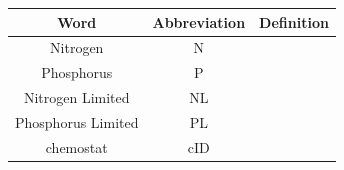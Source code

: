 \documentclass[]{article}
\begin{document}
\begin{longtable}[]{@{}ccc@{}}
\toprule
\begin{minipage}[b]{0.24\columnwidth}\centering\strut
Word\strut
\end{minipage} & \begin{minipage}[b]{0.19\columnwidth}\centering\strut
Abbreviation\strut
\end{minipage} & \begin{minipage}[b]{0.15\columnwidth}\centering\strut
Definition\strut
\end{minipage}\tabularnewline
\midrule
\endhead
\begin{minipage}[t]{0.24\columnwidth}\centering\strut
Nitrogen\strut
\end{minipage} & \begin{minipage}[t]{0.19\columnwidth}\centering\strut
N\strut
\end{minipage} & \begin{minipage}[t]{0.15\columnwidth}\centering\strut
\strut
\end{minipage}\tabularnewline
\begin{minipage}[t]{0.24\columnwidth}\centering\strut
Phosphorus\strut
\end{minipage} & \begin{minipage}[t]{0.19\columnwidth}\centering\strut
P\strut
\end{minipage} & \begin{minipage}[t]{0.15\columnwidth}\centering\strut
\strut
\end{minipage}\tabularnewline
\begin{minipage}[t]{0.24\columnwidth}\centering\strut
Nitrogen Limited\strut
\end{minipage} & \begin{minipage}[t]{0.19\columnwidth}\centering\strut
NL\strut
\end{minipage} & \begin{minipage}[t]{0.15\columnwidth}\centering\strut
\strut
\end{minipage}\tabularnewline
\begin{minipage}[t]{0.24\columnwidth}\centering\strut
Phosphorus Limited\strut
\end{minipage} & \begin{minipage}[t]{0.19\columnwidth}\centering\strut
PL\strut
\end{minipage} & \begin{minipage}[t]{0.15\columnwidth}\centering\strut
\strut
\end{minipage}\tabularnewline
\begin{minipage}[t]{0.24\columnwidth}\centering\strut
chemostat\strut
\end{minipage} & \begin{minipage}[t]{0.19\columnwidth}\centering\strut
cID\strut
\end{minipage} & \begin{minipage}[t]{0.15\columnwidth}\centering\strut
\strut
\end{minipage}\tabularnewline
\bottomrule
\end{longtable}
\end{document}
